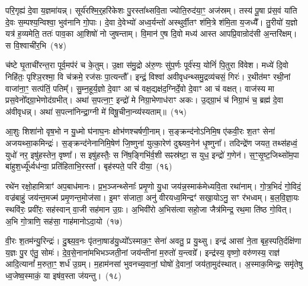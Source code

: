 परि॒गृह्य॑ दे॒वा य॒ज्ञमा॑यन्न्। सूर्य॑रश्मि॒र्॒\mbox{}हरि॑केशः पु॒रस्ता᳚थ्सवि॒ता ज्योति॒रुद॑या॒ꣳ॒ अज॑स्रम्। तस्य॑ पू॒षा प्र॑स॒वं या॑ति दे॒वः स॒म्पश्य॒न्विश्वा॒ भुव॑नानि गो॒पाः। दे॒वा दे॒वेभ्यो॑ अध्व॒र्यन्तो॑ अस्थुर्वी॒तꣳ श॑मि॒त्रे श॑मि॒ता य॒जध्यै᳚। तु॒रीयो॑ य॒ज्ञो यत्र॑ ह॒व्यमेति॒ ततः॑ पाव॒का आ॒शिषो॑ नो जुषन्ताम्। वि॒मान॑ ए॒ष दि॒वो मध्य॑ आस्त आपप्रि॒वान्रोद॑सी अ॒न्तरि॑क्षम्। स वि॒श्वाची॑र॒भि~(१४)\ip

च॑ष्टे घृ॒ताची॑रन्त॒रा पूर्व॒मप॑रं च के॒तुम्। उ॒क्षा स॑मु॒द्रो अ॑रु॒णः सु॑प॒र्णः पूर्व॑स्य॒ योनिं॑ पि॒तुरा वि॑वेश। मध्ये॑ दि॒वो निहि॑तः॒ पृश्ञि॒रश्मा॒ वि च॑क्रमे॒ रज॑सः पा॒त्यन्तौ᳚। इन्द्रं॒ विश्वा॑ अवीवृधन्थ्समु॒द्रव्य॑चसं॒ गिरः॑। र॒थीत॑मꣳ रथी॒नां वाजा॑ना॒ꣳ॒ सत्प॑तिं॒ पतिम्᳚। सु॒म्न॒हूर्य॒ज्ञो दे॒वाꣳ आ च॑ वक्ष॒द्यक्ष॑द॒ग्निर्दे॒वो दे॒वाꣳ आ च॑ वक्षत्। वाज॑स्य मा प्रस॒वेनो᳚द्ग्रा॒भेणोद॑ग्रभीत्। अथा॑ स॒पत्ना॒ꣳ॒ इन्द्रो॑ मे निग्रा॒भेणाध॑राꣳ अकः। उ॒द्ग्रा॒भं च॑ निग्रा॒भं च॒ ब्रह्म॑ दे॒वा अ॑वीवृधन्न्। अथा॑ स॒पत्ना॑निन्द्रा॒ग्नी मे॑ विषू॒चीना॒न्व्य॑स्यताम्॥~(१५)\ip

{\anuvakamend[{दे॒वाः श॒तप॑या अ॒भि वाज॑स्य॒ षड्विꣳ॑शतिश्च}]}

आ॒शुः शिशा॑नो वृष॒भो न यु॒ध्मो घ॑नाघ॒नः क्षोभ॑णश्चर्\mbox{}षणी॒नाम्। स॒ङ्क्रन्द॑नो\-ऽनिमि॒ष ए॑कवी॒रः श॒तꣳ सेना॑ अजयथ्सा॒कमिन्द्रः॑। स॒ङ्क्रन्द॑नेनानिमि॒षेण॑ जि॒ष्णुना॑ युत्का॒रेण॑ दुश्च्यव॒नेन॑ धृ॒ष्णुना᳚। तदिन्द्रे॑ण जयत॒ तथ्स॑हध्वं॒ युधो॑ नर॒ इषु॑हस्तेन॒ वृष्णा᳚। स इषु॑हस्तैः॒ स नि॑ष॒ङ्गिभि॑र्व॒शी सꣴस्र॑ष्टा॒ स युध॒ इन्द्रो॑ ग॒णेन॑। स॒ꣳ॒सृ॒ष्ट॒जिथ्सो॑म॒पा बा॑हुश॒र्ध्यू᳚र्ध्वध॑न्वा॒ प्रति॑हिताभि॒रस्ता᳚। बृह॑स्पते॒ परि॑ दीया॒~(१६)\ip

रथे॑न रक्षो॒हामित्राꣳ॑ अप॒बाध॑मानः। प्र॒भ॒ञ्जन्थ्सेनाः᳚ प्रमृ॒णो यु॒धा जय॑न्न॒स्माक॑मेध्यवि॒ता रथा॑नाम्। गो॒त्र॒भिदं॑ गो॒विदं॒ वज्र॑बाहुं॒ जय॑न्त॒मज्म॑ प्रमृ॒णन्त॒मोज॑सा। इ॒मꣳ स॑जाता॒ अनु॑ वीरयध्व॒मिन्द्रꣳ॑ सखा॒यो\-ऽनु॒ सꣳ र॑भध्वम्। ब॒ल॒वि॒ज्ञा॒यः स्थवि॑रः॒ प्रवी॑रः॒ सह॑स्वान् वा॒जी सह॑मान उ॒ग्रः। अ॒भिवी॑रो अ॒भिस॑त्वा सहो॒जा जैत्र॑मिन्द्र॒ रथ॒मा ति॑ष्ठ गो॒वित्। अ॒भि गो॒त्राणि॒ सह॑सा॒ गाह॑मानो\-ऽदा॒यो~(१७)\ip

वी॒रः श॒तम॑न्यु॒रिन्द्रः॑। दु॒श्च्य॒व॒नः पृ॑तना॒षाड॑यु॒ध्यो᳚\-ऽस्माक॒ꣳ॒ सेना॑ अवतु॒ प्र यु॒थ्सु। इन्द्र॑ आसां ने॒ता बृह॒स्पति॒र्दक्षि॑णा य॒ज्ञः पु॒र ए॑तु॒ सोमः॑। दे॒व॒से॒नाना॑मभिभञ्जती॒नां जय॑न्तीनां म॒रुतो॑ य॒न्त्वग्रे᳚। इन्द्र॑स्य॒ वृष्णो॒ वरु॑णस्य॒ राज्ञ॑ आदि॒त्यानां᳚ म॒रुता॒ꣳ॒ शर्ध॑ उ॒ग्रम्। म॒हाम॑नसां भुवनच्य॒वानां॒ घोषो॑ दे॒वानां॒ जय॑ता॒मुद॑स्थात्। अ॒स्माक॒मिन्द्रः॒ समृ॑तेषु ध्व॒जेष्व॒स्माकं॒ या इष॑व॒स्ता ज॑यन्तु।~(१८)\ip

